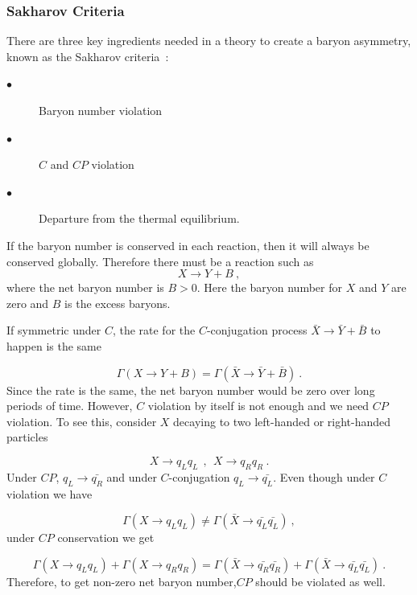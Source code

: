 \subsubsection{Sakharov Criteria}
There are three key ingredients needed in a theory to create a baryon
asymmetry, known as the Sakharov criteria~\cite{Sakharov:1967dj}:
\begin{center}
\begin{description}
\item[$\bullet$]Baryon number violation
\item[$\bullet$] $C$ and $CP$ violation
\item[$\bullet$] Departure from the thermal equilibrium.
\end{description}
\end{center}

If the baryon number is conserved in each reaction, then it will
always be conserved globally. Therefore there must be a reaction such as
\begin{equation}
X \rightarrow Y + B~,
\end{equation}
where the net baryon number is $B > 0$. Here the baryon number for $X$
and $Y$ are zero and $B$ is the excess baryons.

If symmetric under $C$, the rate for the $C$-conjugation process
$\bar{X} \rightarrow \bar{Y}+ \bar{B}$ to happen is the same

\begin{equation}
\Gamma(X \rightarrow Y + B) = \Gamma(\bar{X} \rightarrow \bar{Y}+ \bar{B})~.
\end{equation}
Since the rate is the same, the net baryon number would be zero over
long periods of time. However, $C$ violation by itself is not enough
and we need $CP$ violation. To see this, consider $X$ decaying to two
left-handed or right-handed particles

\begin{equation}
X \rightarrow q_Lq_L ~~,~~ X\rightarrow q_Rq_R~.
\end{equation}
Under $CP$, $q_L \rightarrow \bar{q_R}$ and under $C$-conjugation
$q_L \rightarrow \bar{q_L}$. Even though under $C$ violation we have

\begin{equation}
\Gamma(X \rightarrow q_Lq_L) \neq \Gamma(\bar{X} \rightarrow \bar{q_L}\bar{q_L})~,
\end{equation}
under $CP$ conservation we get

\begin{equation}
  \Gamma(X \rightarrow q_Lq_L) + \Gamma(X \rightarrow q_Rq_R) = \Gamma(\bar{X} \rightarrow \bar{q_R}\bar{q_R}) + \Gamma(\bar{X} \rightarrow \bar{q_L}\bar{q_L})~.
\end{equation}
Therefore, to get non-zero net baryon number,$CP$ should be violated
as well.

